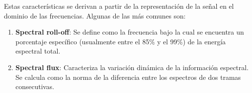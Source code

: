 Estas características se derivan a partir de la representación de la señal en el dominio de las frecuencias.
Algunas de las más comunes son:

\begin{enumerate}
    \item \textbf{Spectral roll-off}: Se define como la frecuencia bajo la cual se encuentra un porcentaje específico (usualmente entre el 85\% y el 99\%) de la energía espectral total.
    \item \textbf{Spectral flux}: Caracteriza la variación dinámica de la información espectral.
    Se calcula como la norma de la diferencia entre los espectros de dos tramas consecutivas.
\end{enumerate}